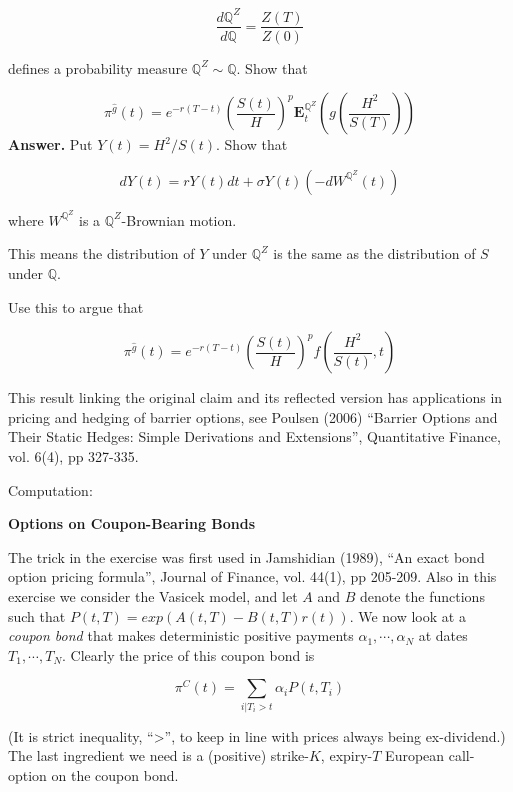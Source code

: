 \documentclass[a4paper]{article}
\begin{document}
$$\frac{d\mathbb{Q}^{Z}}{d\mathbb{Q}}=\frac{Z\left(T\right)}{Z\left(0\right)}$$

defines a probability measure $\mathbb{Q}^{Z}\sim \mathbb{Q}$. Show that

$$\pi^{\hat{g}}\left(t\right)=e^{-r\left(T-t\right)}\left(\frac{S\left(t\right)}{H}\right)^{p}\mathbf{E}^{\mathbb{Q}^{Z}}_{t}\left(g\left(\frac{H^{2}}{S\left(T\right)}\right)\right)$$
\textbf{Answer.}
Put $Y\left(t\right) = H^{2}/S\left(t\right)$. Show that

$$dY\left(t\right)=rY\left(t\right)dt+\sigma Y\left(t\right)\left(-dW^{\mathbb{Q}^{Z}}\left(t\right)\right)$$

where $W^{\mathbb{Q}^{Z}}$ is a $\mathbb{Q}^{Z}$-Brownian motion.

This means the distribution of $Y$ under $\mathbb{Q}^{Z}$ is the same as the distribution of $S$ under $\mathbb{Q}$.

Use this to argue that

$$\pi^{\hat{g}}\left(t\right)=e^{-r\left(T-t\right)}\left(\frac{S\left(t\right)}{H}\right)^{p}f\left(\frac{H^{2}}{S\left(t\right)},t\right)$$

This result linking the original claim and its reflected version has applications in pricing and hedging of barrier options, see Poulsen (2006) ``Barrier Options and Their Static Hedges: Simple Derivations and Extensions'', Quantitative Finance, vol. 6(4), pp 327-335.

\vspace{0.2cm}
Computation:


\vspace{0.4cm}
{\Large{\textbf{Options on Coupon-Bearing Bonds}}}\\
\vspace{0.2cm}

The trick in the exercise was first used in Jamshidian (1989), ``An exact bond option pricing formula'', Journal of Finance, vol. 44(1), pp 205-209. Also in this exercise we consider the Vasicek model, and let $A$ and $B$ denote the functions such that $P\left(t,T\right)=exp\left(A\left(t,T\right)-B\left(t,T\right)r\left(t\right)\right)$. We now look at a \textit{coupon bond} that makes deterministic positive payments $\alpha_1, \cdots, \alpha_N$ at dates $T_1, \cdots, T_N$. Clearly the price of this coupon bond is

$$\pi^{C}\left(t\right)=\sum_{i|T_i >t}\alpha_i P\left(t, T_i\right)$$

(It is strict inequality, ``>'', to keep in line with prices always being ex-dividend.) The last ingredient we need is a (positive) strike-$K$, expiry-$T$ European call-option on the coupon bond.
\end{document}

